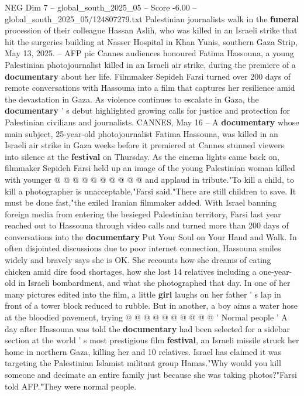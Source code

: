 \begin{textsample}{NEG Dim 7 – global\_south\_2025\_05 – Score -6.00 – global\_south\_2025\_05/124807279.txt}  \label{ex:f7_neg_212}
Palestinian journalists walk in the \textbf{funeral} procession of their colleague Hassan Aslih, who was killed in an Israeli strike that hit the surgeries building at Nasser Hospital in Khan Yunis, southern Gaza Strip, May 13, 2025. -- AFP pic Cannes audiences honoured Fatima Hassouna, a young Palestinian photojournalist killed in an Israeli air strike, during the premiere of a \textbf{documentary} about her life.
Filmmaker Sepideh Farsi turned over 200 days of remote conversations with Hassouna into a film that captures her resilience amid the devastation in Gaza.
As violence continues to escalate in Gaza, the \textbf{documentary} ' s debut highlighted growing calls for justice and protection for Palestinian civilians and journalists.
CANNES, May 16 -- A \textbf{documentary} whose main subject, 25-year-old photojournalist Fatima Hassouna, was killed in an Israeli air strike in Gaza weeks before it premiered at Cannes stunned viewers into silence at the \textbf{festival} on Thursday.
As the cinema lights came back on, filmmaker Sepideh Farsi held up an image of the young Palestinian woman killed with younger @ @ @ @ @ @ @ @ @ @ and applaud in tribute."To kill a child, to kill a photographer is unacceptable,"Farsi said."There are still children to save.
It must be done fast,"the exiled Iranian filmmaker added.
With Israel banning foreign media from entering the besieged Palestinian territory, Farsi last year reached out to Hassouna through video calls and turned more than 200 days of conversations into the \textbf{documentary} Put Your Soul on Your Hand and Walk.
In often disjointed discussions due to poor internet connection, Hassouna smiles widely and bravely says she is OK.
She recounts how she dreams of eating chicken amid dire food shortages, how she lost 14 relatives including a one-year-old in Israeli bombardment, and what she photographed that day.
In one of her many pictures edited into the film, a little \textbf{girl} laughs on her father ' s lap in front of a tower block reduced to rubble.
But in another, a boy aims a water hose at the bloodied pavement, trying @ @ @ @ @ @ @ @ @ @ ' Normal people ' A day after Hassouna was told the \textbf{documentary} had been selected for a sidebar section at the world ' s most prestigious film \textbf{festival}, an Israeli missile struck her home in northern Gaza, killing her and 10 relatives.
Israel has claimed it was targeting the Palestinian Islamist militant group Hamas."Why would you kill someone and decimate an entire family just because she was taking photos?"Farsi told AFP."They were normal people.

\end{textsample}
